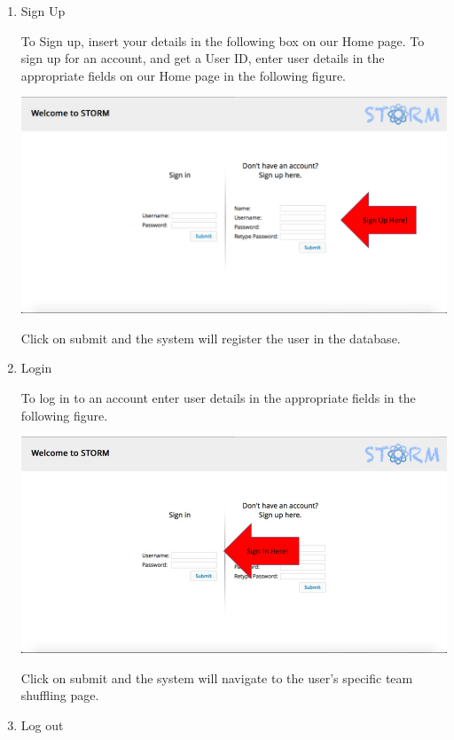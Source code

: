 \begin{enumerate}
\item Sign Up\par

To Sign up, insert your details in the following box on our Home page.
To sign up for an account, and get a User ID, enter user details in the appropriate fields on our Home page in the following figure.\par

\includegraphics[width=13cm]{./graphics/StormUMSU1.jpg}\par
Click on submit and the system will register the user in the database.

\item Login\par
To log in to an account enter user details in the appropriate fields in the following figure.\par
\includegraphics[width=13cm]{./graphics/StormUMSU2.jpg}\par
Click on submit and the system will navigate to the user's specific team shuffling page.

\item Log out\par
\end{enumerate}
